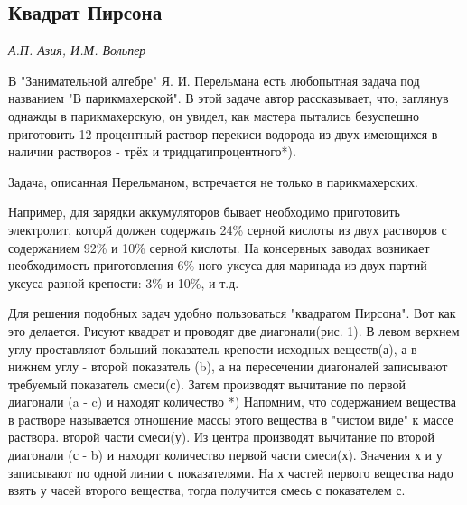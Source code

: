 \begin{multicols}{2}
\part*{\textbf{Квадрат Пирсона}}
\emph{А.П. Азия, И.М. Вольпер}\large{}
\vspace{4cm}
\par
В "Занимательной алгебре" Я. И. Перельмана есть любопытная задача под названием "В парикмахерской". В этой задаче автор рассказывает, что, заглянув однажды в парикмахерскую, он увидел, как мастера пытались безуспешно приготовить 12-процентный раствор перекиси водорода из двух имеющихся в наличии растворов - трёх и тридцатипроцентного*).
\par
Задача, описанная Перельманом, встречается не только в парикмахерских.
\par
Например, для зарядки аккумуляторов бывает необходимо приготовить электролит, которй должен содержать 24\% серной кислоты из двух растворов с содержанием 92\% и 10\% серной кислоты. На консервных заводах возникает необходимость приготовления 6\%-ного уксуса для маринада из двух партий уксуса разной крепости: 3\% и 10\%, и т.д.
\par
Для решения подобных задач удобно пользоваться "квадратом Пирсона". Вот как это делается. Рисуют квадрат и проводят две диагонали(рис. 1). В левом верхнем углу проставляют больший показатель крепости исходных веществ(а), а в нижнем углу - второй показатель (b), а на пересечении диагоналей записывают требуемый показатель смеси(с). Затем производят вычитание по первой диагонали (a - c) и находят количество
\hline
*) Напомним, что содержанием вещества в растворе называется отношение массы этого вещества в "чистом виде" к массе раствора.
\columnbreak
второй части смеси(у). Из центра производят вычитание по второй диагонали (с - b) и находят количество первой части смеси(х). Значения х и у записывают по одной линии с показателями. На х частей первого вещества надо взять у часей второго вещества, тогда получится смесь с показателем с.
\begin{minipage}[h]{0.49\linewidth}
 \\

\end{minipage}
\end{multicols}

